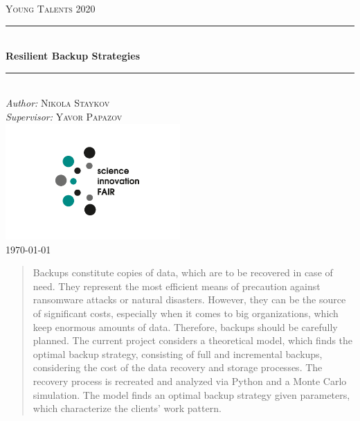 \documentclass[11pt, a4paper]{article}
\theoremstyle{definition}
\begin{document}
\begin{titlepage}
	\newcommand{\HRule}{\rule{\linewidth}{0.5mm}}
	\centering
	\textsc{\LARGE Young Talents 2020}\\[1cm]
	\HRule\\[1 cm]
	{\huge\bfseries Resilient Backup Strategies}\\[0.5 cm] 
	\HRule\\
			\vfill
			\Large
			\textit{Author:}
			\textsc{Nikola Staykov}\\
            \vspace{2cm}
			\Large
			\textit{Supervisor:}
            \textsc{Yavor Papazov}\\
            \includegraphics[width=0.5\textwidth]{Innofair_logo.png}\\
    \vfill	
	{\large\today}   
	\vfill
\end{titlepage}

\tableofcontents
\newpage
\begin{abstract}
		Backups constitute copies of data, which are to be recovered in case of need. They represent the most efficient means of precaution against ransomware attacks or natural disasters. However, they can be the source of significant costs, especially when it comes to big organizations, which keep enormous amounts of data. Therefore, backups should be carefully planned. The current project considers a theoretical model, which finds the optimal   backup strategy, consisting of full and incremental backups, considering the cost of the data recovery and storage processes. The recovery process is recreated and analyzed via Python and a Monte Carlo simulation. The model finds an optimal backup strategy given parameters, which characterize the clients' work pattern.
\end{abstract}
\end{document}
